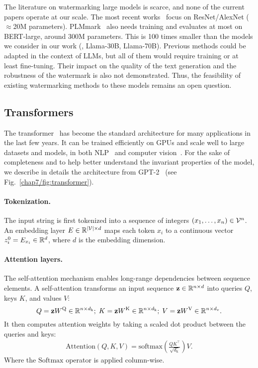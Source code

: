The literature on watermarking large models is scarce, and none of the current papers operate at our scale. 
The most recent works~\citep{liu2023trapdoor, jiang2023ipcert, tondi2024robust} focus on ResNet/AlexNet ($\approx$20M parameters). 
PLMmark~\citep{li2023plmmark} also needs training and evaluates at most on BERT-large, around 300M parameters. 
This is 100 times smaller than the models we consider in our work (\eg, Llama-30B, Llama-70B). 
Previous methods could be adapted in the context of LLMs, but all of them would require training or at least fine-tuning. 
Their impact on the quality of the text generation and the robustness of the watermark is also not demonstrated. 
Thus, the feasibility of existing watermarking methods to these models remains an open question.



\subsection{Transformers}

The transformer~\citep{vaswani2017attention} has become the standard architecture for many applications in the last few years.
It can be trained efficiently on GPUs and scale well to large datasets and models, in both NLP~\citep{raffel2020exploring, kaplan2020scaling} and computer vision~\citep{dehghani2023scaling, oquab2023dinov2}.
For the sake of completeness and to help better understand the invariant properties of the model, we describe in details the architecture from GPT-2~\citep{radford2019language} (see Fig.~\ref{chap7/fig:transformer}).

\paragraph*{Tokenization.} The input string is first tokenized into a sequence of integers $(x_1, \dots, x_n) \in \mathcal{V}^n$.
An embedding layer $E \in \mathbb{R}^{|\mathcal{V}|\times d}$ maps each token $x_i$ to a continuous vector $z_i^0 = E_{x_i} \in \mathbb{R}^d $, where $d$ is the embedding dimension.


\paragraph*{Attention layers.} 
The self-attention mechanism enables long-range dependencies between sequence elements.
A self-attention transforms an input sequence $\mathbf{z} \in \mathbb{R}^{n \times d}$ into queries $Q$, keys $K$, and values $V$:
\begin{equation}
    Q = \mathbf{z}W^\mathrm{Q} \in \mathbb{R}^{n \times d_\mathrm{k}};\;
    K = \mathbf{z}W^\mathrm{K} \in \mathbb{R}^{n \times d_\mathrm{k}};\;
    V = \mathbf{z}W^\mathrm{V} \in \mathbb{R}^{n \times d_\mathrm{v}}.
\end{equation}
It then computes attention weights by taking a scaled dot product between the queries and keys:
\begin{align}\label{chap7/eq:attention}
    \mathrm{Attention}(Q,K,V) = \mathrm{softmax} \left( \frac{QK^\top}{\sqrt{d_\mathrm{k}}} \right)V.
\end{align}
Where the $\mathrm{Softmax}$ operator is applied column-wise.

